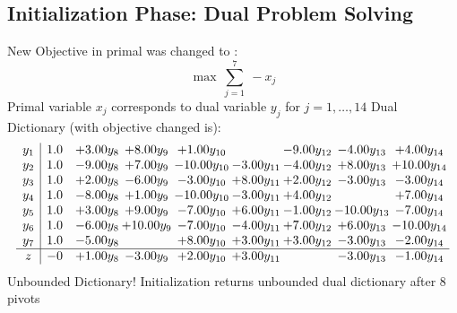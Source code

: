 \documentclass[8pt]{article}
\begin{document}
\subsection{Initialization Phase: Dual Problem Solving}
New Objective in primal was changed to : \[ \max\ \sum_{j=1}^{7}\ - x_j \] 
Primal variable $x_j$ corresponds to dual variable $y_j$ for $j = 1,\ldots,14$
Dual Dictionary (with objective changed is): 
\[\begin{array}{c| c c@{\hskip 2pt} c@{\hskip 2pt} c@{\hskip 2pt} c@{\hskip 2pt} c@{\hskip 2pt} c@{\hskip 2pt} c@{\hskip 2pt} }
 y_{1}   &  1.0 & +  3.00 y_{8} & +  8.00 y_{9} & +  1.00 y_{10} &   & -9.00 y_{12} & -4.00 y_{13} & +  4.00 y_{14}\\
 y_{2}   &  1.0 & -9.00 y_{8} & +  7.00 y_{9} & -10.00 y_{10} & -3.00 y_{11} & -4.00 y_{12} & +  8.00 y_{13} & + 10.00 y_{14}\\
 y_{3}   &  1.0 & +  2.00 y_{8} & -6.00 y_{9} & -3.00 y_{10} & +  8.00 y_{11} & +  2.00 y_{12} & -3.00 y_{13} & -3.00 y_{14}\\
 y_{4}   &  1.0 & -8.00 y_{8} & +  1.00 y_{9} & -10.00 y_{10} & -3.00 y_{11} & +  4.00 y_{12} &   & +  7.00 y_{14}\\
 y_{5}   &  1.0 & +  3.00 y_{8} & +  9.00 y_{9} & -7.00 y_{10} & +  6.00 y_{11} & -1.00 y_{12} & -10.00 y_{13} & -7.00 y_{14}\\
 y_{6}   &  1.0 & -6.00 y_{8} & + 10.00 y_{9} & -7.00 y_{10} & -4.00 y_{11} & +  7.00 y_{12} & +  6.00 y_{13} & -10.00 y_{14}\\
 y_{7}   &  1.0 & -5.00 y_{8} &   & +  8.00 y_{10} & +  3.00 y_{11} & +  3.00 y_{12} & -3.00 y_{13} & -2.00 y_{14}\\
\hline
z    &  -0 & +  1.00 y_{8} & -3.00 y_{9} & +  2.00 y_{10} & +  3.00 y_{11} &   & -3.00 y_{13} & -1.00 y_{14}\\
\end{array}\]
Unbounded Dictionary!
Initialization returns unbounded dual dictionary after 8 pivots
\end{document}
